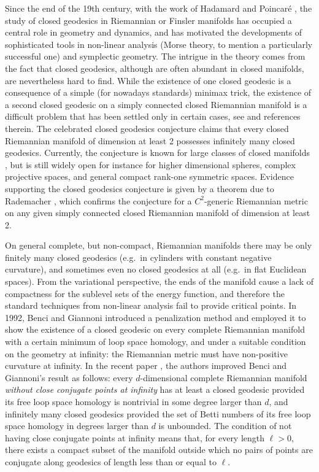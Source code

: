\documentclass[reqno]{amsart}
\numberwithin{equation}{section}
\theoremstyle{personal}%
\theoremstyle{definition}
\begin{document}
Since the end of the 19th century, with the work of Hadamard \cite{Hadamard:1898ww} and Poincar\'e \cite{Poincare:1905jp, Poincare:1987yj}, the study of closed geodesics in Riemannian or Finsler manifolds has occupied a central role in geometry and dynamics, and has motivated the developments of sophisticated tools in non-linear analysis (Morse theory, to mention a particularly successful one) and symplectic geometry. The intrigue in the theory comes from the fact that closed geodesics, although are often abundant in closed manifolds, are nevertheless hard to find. While the existence of one closed geodesic \cite{Birkhoff:1966xb, Lyusternik:1951jt} is a consequence of a simple (for nowadays standards) minimax trick, the existence of a second closed geodesic on a simply connected closed Riemannian manifold is a difficult problem that has been settled only in certain cases, see \cite{Bangert:2010ak, Long:2009zm} and references therein. The celebrated closed geodesics conjecture claims that every closed Riemannian manifold of dimension at least 2 possesses infinitely many closed geodesics. Currently, the conjecture is known for large classes of closed manifolds \cite{Gromoll:1969gh, Bangert:1984ni, Bangert:1993wo, Franks:1992jt}, but is still widely open for instance for higher dimensional spheres, complex projective spaces, and general compact rank-one symmetric spaces.  Evidence supporting the closed geodesics conjecture is given by a theorem due to Rademacher \cite{Rademacher:1989te, Rademacher:1994ju}, which confirms the conjecture for a $C^2$-generic Riemannian metric on any given simply connected closed Riemannian manifold of dimension at least 2.

On general complete, but non-compact, Riemannian manifolds there may be only finitely many closed geodesics (e.g.\ in cylinders with constant negative curvature), and sometimes even no closed geodesics at all (e.g.\ in flat Euclidean spaces). From the variational perspective, the ends of the manifold cause a lack of compactness for the sublevel sets of the energy function, and therefore the standard techniques from non-linear analysis fail to provide critical points. In 1992, Benci and Giannoni  \cite{Benci:1992lq} introduced a penalization method and employed it to show the existence of a closed geodesic on every complete Riemannian manifold with a certain minimum of loop space homology, and under a suitable condition on the geometry at infinity: the Riemannian metric must have non-positive curvature at infinity. In the recent paper \cite{Asselle:2017pd}, the authors improved Benci and Giannoni's result as follows: every $d$-dimensional complete Riemannian manifold \emph{without close conjugate points at infinity} has at least a closed geodesic provided its free loop space homology is nontrivial in some degree larger than $d$, and infinitely many closed geodesics provided the set of Betti numbers of its free loop space homology in degrees larger than $d$ is unbounded. The condition of not having close conjugate points at infinity means that, for every length $\ell>0$, there exists a compact subset of the manifold outside which no pairs of points are conjugate along geodesics of length less than or equal to $\ell$.
\end{document}
